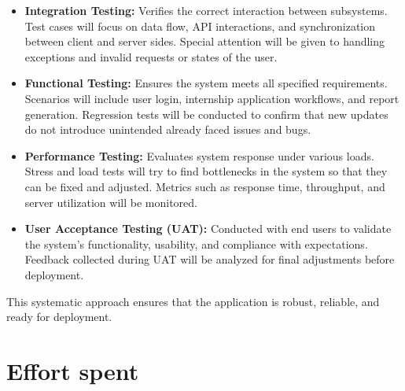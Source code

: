 \documentclass[11pt,twoside]{article}
\begin{document}
\begin{itemize}
    \item \textbf{Integration Testing:} Verifies the correct interaction between subsystems. Test cases will focus on data flow, API interactions, and synchronization between client and server sides. Special attention will be given to handling exceptions and invalid requests or states of the user.
    \item \textbf{Functional Testing:} Ensures the system meets all specified requirements. Scenarios will include user login, internship application workflows, and report generation. Regression tests will be conducted to confirm that new updates do not introduce unintended already faced issues and bugs.
    \item \textbf{Performance Testing:} Evaluates system response under various loads. Stress and load tests will try to find bottlenecks in the system so that they can be fixed and adjusted. Metrics such as response time, throughput, and server utilization will be monitored.
    \item \textbf{User Acceptance Testing (UAT):} Conducted with end users to validate the system's functionality, usability, and compliance with expectations. Feedback collected during UAT will be analyzed for final adjustments before deployment.
\end{itemize}

This systematic approach ensures that the application is robust, reliable, and ready for deployment.

	
\newpage

\section{Effort spent}
\end{document}
